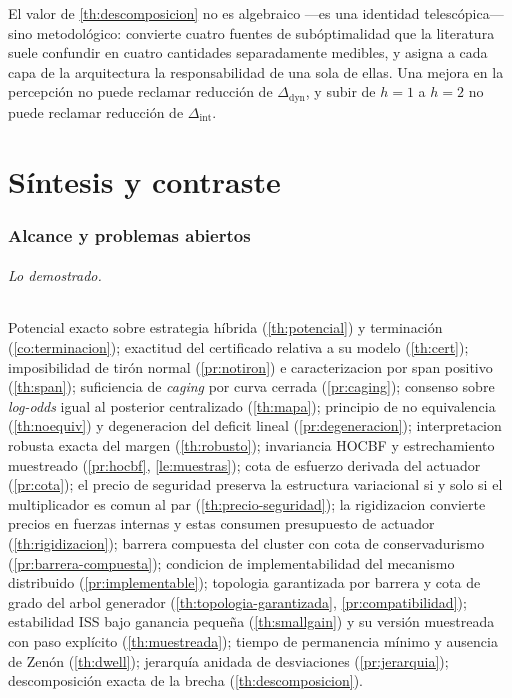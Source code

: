 \documentclass[11pt,a4paper]{article}
\theoremstyle{plain}
\theoremstyle{definition}
\theoremstyle{remark}
\begin{document}
El valor de \cref{th:descomposicion} no es algebraico —es una identidad
telescópica— sino metodológico: convierte cuatro fuentes de subóptimalidad que
la literatura suele confundir en cuatro cantidades separadamente medibles, y
asigna a cada capa de la arquitectura la responsabilidad de una sola de ellas.
Una mejora en la percepción no puede reclamar reducción de
$\Delta_{\mathrm{dyn}}$, y subir de $h=1$ a $h=2$ no puede reclamar reducción de
$\Delta_{\mathrm{int}}$.






\part{Síntesis y contraste}











\section{Alcance y problemas abiertos}

\paragraph{Lo demostrado.} Potencial exacto sobre estrategia híbrida
(\cref{th:potencial}) y terminación (\cref{co:terminacion}); exactitud del
certificado relativa a su modelo (\cref{th:cert}); imposibilidad de tirón
normal (\cref{pr:notiron}) e caracterizacion por span positivo (\cref{th:span});
suficiencia de \emph{caging} por curva cerrada (\cref{pr:caging}); consenso
sobre \emph{log-odds} igual al posterior centralizado (\cref{th:mapa});
principio de no equivalencia (\cref{th:noequiv}) y degeneracion del deficit
lineal (\cref{pr:degeneracion}); interpretacion robusta exacta del margen
(\cref{th:robusto}); invariancia HOCBF y estrechamiento muestreado
(\cref{pr:hocbf}, \cref{le:muestras}); cota de esfuerzo derivada del actuador
(\cref{pr:cota}); el precio de seguridad preserva la estructura variacional
si y solo si el multiplicador es comun al par (\cref{th:precio-seguridad});
la rigidizacion convierte precios en fuerzas internas y estas consumen
presupuesto de actuador (\cref{th:rigidizacion}); barrera compuesta del
cluster con cota de conservadurismo (\cref{pr:barrera-compuesta});
condicion de implementabilidad del mecanismo distribuido
(\cref{pr:implementable}); topologia garantizada por barrera y cota de
grado del arbol generador (\cref{th:topologia-garantizada}, \cref{pr:compatibilidad});
estabilidad ISS bajo ganancia pequeña (\cref{th:smallgain}) y su versión
muestreada con paso explícito (\cref{th:muestreada}); tiempo de permanencia mínimo y ausencia de Zenón
(\cref{th:dwell}); jerarquía anidada de desviaciones (\cref{pr:jerarquia}); descomposición exacta de la brecha
(\cref{th:descomposicion}).
\end{document}
